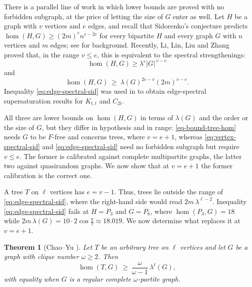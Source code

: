 \documentclass[11pt, a4paper]{article}
\newtheorem{theorem}{Theorem}[section]
\theoremstyle{definition}
\theoremstyle{plain}
\renewcommand{\le}{\leqslant}
\renewcommand{\ge}{\geqslant}
\begin{document}
There is a parallel line of work in which lower
bounds are proved with no forbidden subgraph, at the price of letting the size of $G$ enter as well. Let $H$ be a graph with $v$ vertices and $e$ edges, and recall that Sidorenko's conjecture \cite{Sid1993} predicts
$\hom (H,G)\ge (2m)^{e}n^{v-2e}$ for every
bipartite $H$ and every graph $G$ with $n$
vertices and $m$ edges; see \cite{Szegedy2014, KLL2016, CKLL2018} for background. 
Recently, Li, Lin, Liu and Zhang \cite{LLLZ-Sidorenko} proved that, in the range $v\le e$, this is equivalent to the spectral strengthenings:  
\begin{equation} 
\label{eq:vertex-spectral-sid}
\hom (H,G)\ge \lambda^{e}|G|^{\,v-e}
\end{equation}
and 
\begin{equation}\label{eq:edge-spectral-sid}
  \hom (H,G)\ \ge\
  \lambda (G)^{2e-v}(2m)^{v-e}.
\end{equation}
Inequality \eqref{eq:edge-spectral-sid} was used in \cite{LLLZ-Sidorenko} to
obtain edge-spectral supersaturation results for $K_{t,t}$ and $C_{2t}$. 


All three are lower bounds on $\hom (H,G)$ in terms of $\lambda (G)$ and the
order or the size of $G$, but they differ in hypothesis and in range:
\eqref{eq-bound-tree-hom} needs $G$ to be $F$-free and concerns trees, where
$v=e+1$, whereas \eqref{eq:vertex-spectral-sid} and
\eqref{eq:edge-spectral-sid} need no forbidden subgraph but require $v\le e$.
The former is calibrated against complete multipartite graphs, the latter two
against quasirandom graphs. We now show that at $v=e+1$ the former calibration
is the correct one. 


A tree $T$ on $\ell$ vertices has $e=v-1$. 
Thus, trees lie outside the range of
\eqref{eq:edge-spectral-sid}, where the
right-hand side would read $2m\,\lambda^{\ell-2}$. 
Inequality \eqref{eq:edge-spectral-sid} fails at  $H=P_3$ and $G=P_6$, where
$\hom (P_3,G)=18$ while
$2m\,\lambda (G)=10\cdot 2\cos \frac{\pi}{7}
\approx 18.019$.   
We now determine what replaces it at $v=e+1$.

\begin{theorem}[Chao--Yu \cite{CY2026}]  
\label{thm:tree-Chao-Yu} 
Let $T$ be an arbitrary tree on $\ell $ vertices and let
$G$ be a graph with clique number $\omega \ge 2$. Then
\begin{equation*} 
\hom (T,G) \ \ge \ \frac{\omega}{\omega -1} \, 
\lambda^{\ell}(G), 
\end{equation*}
with equality when $G$ is a regular complete
$\omega$-partite graph.
\end{theorem}
\end{document}
